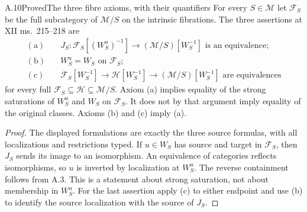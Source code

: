 \begin{claim}{A.10}{Proved}{The three fibre axioms, with their quantifiers}
For every $S\in\mathcal M$ let $\mathcal F_S$ be the full subcategory of $\mathcal M/S$ on the intrinsic fibrations. The three assertions at XII ms.~215--218 are
\[
\begin{aligned}
\mathrm{(a)}&\quad J_S:\mathcal F_S[(W_S^u)^{-1}]
 \longrightarrow(\mathcal M/S)[W_S^{-1}]\text{ is an equivalence};\\
\mathrm{(b)}&\quad W_S^u=W_S\text{ on }\mathcal F_S;\\
\mathrm{(c)}&\quad\mathcal F_S[W_S^{-1}]\longrightarrow
 \mathcal H[W_S^{-1}]\longrightarrow(\mathcal M/S)[W_S^{-1}]
 \text{ are equivalences}
\end{aligned}
\]
for every full $\mathcal F_S\subseteq\mathcal H\subseteq\mathcal M/S$.
Axiom (a) implies equality of the strong saturations of $W_S^u$ and $W_S$ on $\mathcal F_S$. It does not by that argument imply equality of the original classes. Axioms (b) and (c) imply (a).
\end{claim}
\begin{proof}
The displayed formulations are exactly the three source formulas, with all localizations and restrictions typed. If $u\in W_S$ has source and target in $\mathcal F_S$, then $J_S$ sends its image to an isomorphism. An equivalence of categories reflects isomorphisms, so $u$ is inverted by localization at $W_S^u$. The reverse containment follows from A.3. This is a statement about strong saturation, not about membership in $W_S^u$. For the last assertion apply (c) to either endpoint and use (b) to identify the source localization with the source of $J_S$.
\end{proof}

